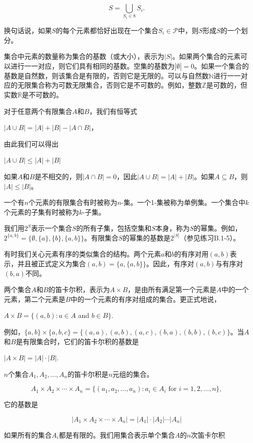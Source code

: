 \documentclass[lang=cn,newtx,10pt,scheme=chinese]{elegantbook}
\begin{document}
$$
S=\bigcup_{S_i \in 8} S_i .
$$

换句话说，如果$S$的每个元素都恰好出现在一个集合$S_i \in \mathcal{P}$中，则$S$形成$S$的一个划分。

集合中元素的数量称为集合的基数（或大小），表示为$|S|$。如果两个集合的元素可以进行一一对应，则它们具有相同的基数。空集的基数为$|\emptyset|=0$。如果一个集合的基数是自然数，则该集合是有限的，否则它是无限的。可以与自然数$\mathbb{N}$进行一一对应的无限集合称为可数无限集合，否则它是不可数的。例如，整数$\mathbb{Z}$是可数的，但实数$\mathbb{R}$是不可数的。

对于任意两个有限集合$A$和$B$，我们有恒等式

$|A \cup B|=|A|+|B|-|A \cap B|$，

由此我们可以得出

$|A \cup B| \leq|A|+|B|$

如果$A$和$B$是不相交的，则$|A \cap B|=0$，因此$|A \cup B|=|A|+|B|$。如果$A \subseteq B$，则$|A| \leq|B|$。

一个有$n$个元素的有限集合有时被称为$n$-集。一个1-集被称为单例集。一个集合中$k$个元素的子集有时被称为$k$-子集。

我们用$2^S$表示一个集合$S$的所有子集，包括空集和$S$本身，称为$S$的幂集。例如，$2^{\{a, b\}}=\{\emptyset,\{a\},\{b\},\{a, b\}\}$。有限集合$S$的幂集的基数是$2^{|S|}$（参见练习B.1-5）。

有时我们关心元素有序的类似集合的结构。两个元素$a$和$b$的有序对用$(a, b)$表示，并且被正式定义为集合$(a, b)=\{a,\{a, b\}\}$。因此，有序对$(a, b)$与有序对$(b, a)$不同。

两个集合$A$和$B$的笛卡尔积，表示为$A \times B$，是由所有满足第一个元素是$A$中的一个元素，第二个元素是$B$中的一个元素的有序对组成的集合。更正式地说，

$A \times B=\{(a, b): a \in A$ and $b \in B\}$.

例如，$\{a, b\} \times\{a, b, c\}=\{(a, a),(a, b),(a, c),(b, a),(b, b),(b, c)\}$。当$A$和$B$是有限集合时，它们的笛卡尔积的基数是

$|A \times B|=|A| \cdot|B|$.

$n$个集合$A_1, A_2, \ldots, A_n$的笛卡尔积是$n$元组的集合。

$$
A_1 \times A_2 \times \cdots \times A_n=\{(a_1, a_2, \ldots, a_n): a_i \in A_i \text { for } i=1,2, \ldots, n\},
$$

它的基数是

$$
|A_1 \times A_2 \times \cdots \times A_n|=|A_1| \cdot|A_2| \cdots|A_n|
$$

如果所有的集合$A_i$都是有限的。我们用集合表示单个集合$A$的$n$次笛卡尔积
\end{document}
